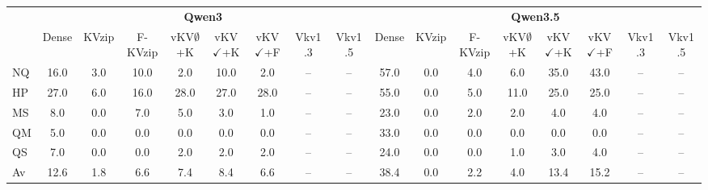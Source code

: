 \begin{tabular}{l|cccccccc|cccccccc}
\toprule
 & \multicolumn{8}{c|}{\textbf{Qwen3}} & \multicolumn{8}{c}{\textbf{Qwen3.5}} \\
 & Dense & KVzip & F-KVzip & vKV$\emptyset$+K & vKV$\checkmark$+K & vKV$\checkmark$+F & Vkv1 .3 & Vkv1 .5 & Dense & KVzip & F-KVzip & vKV$\emptyset$+K & vKV$\checkmark$+K & vKV$\checkmark$+F & Vkv1 .3 & Vkv1 .5 \\
\midrule
NQ & 16.0 & 3.0 & 10.0 & 2.0 & 10.0 & 2.0 & -- & -- & 57.0 & 0.0 & 4.0 & 6.0 & 35.0 & 43.0 & -- & -- \\
HP & 27.0 & 6.0 & 16.0 & 28.0 & 27.0 & 28.0 & -- & -- & 55.0 & 0.0 & 5.0 & 11.0 & 25.0 & 25.0 & -- & -- \\
MS & 8.0 & 0.0 & 7.0 & 5.0 & 3.0 & 1.0 & -- & -- & 23.0 & 0.0 & 2.0 & 2.0 & 4.0 & 4.0 & -- & -- \\
QM & 5.0 & 0.0 & 0.0 & 0.0 & 0.0 & 0.0 & -- & -- & 33.0 & 0.0 & 0.0 & 0.0 & 0.0 & 0.0 & -- & -- \\
QS & 7.0 & 0.0 & 0.0 & 2.0 & 2.0 & 2.0 & -- & -- & 24.0 & 0.0 & 0.0 & 1.0 & 3.0 & 4.0 & -- & -- \\
\midrule
Av & 12.6 & 1.8 & 6.6 & 7.4 & 8.4 & 6.6 & -- & -- & 38.4 & 0.0 & 2.2 & 4.0 & 13.4 & 15.2 & -- & -- \\
\bottomrule
\end{tabular}
